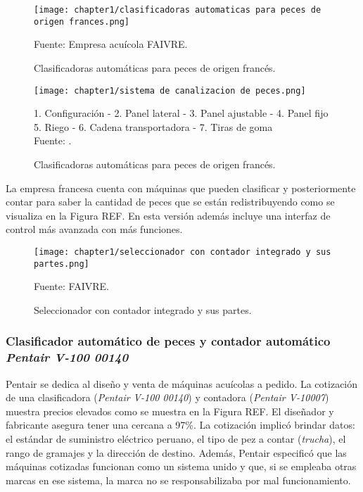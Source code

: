 \begin{figure}[H]
	\centering
	\texttt{[image: chapter1/clasificadoras automaticas para peces de origen frances.png]}
	\caption{Clasificadoras automáticas para peces de origen francés.}
	Fuente: Empresa acuícola FAIVRE.
	\label{fig:clasificadoras automaticas para peces de origen frances}
\end{figure}

\begin{figure}[H]
	\centering
	\texttt{[image: chapter1/sistema de canalizacion de peces.png]}
	\caption{Clasificadoras automáticas para peces de origen francés.}
	1. Configuración - 2. Panel lateral - 3. Panel ajustable - 4. Panel fijo \\
	5. Riego - 6. Cadena transportadora - 7. Tiras de goma\\
	Fuente: \cite{FAIVRE2018}.
	\label{fig:sistema de canalizacion de peces}
\end{figure}

La empresa francesa cuenta con máquinas que pueden clasificar y posteriormente contar para saber la cantidad de peces que se están redistribuyendo como se visualiza en la Figura REF. En esta versión además incluye una interfaz de control más avanzada con más funciones.

\begin{figure}[H]
	\centering
	\texttt{[image: chapter1/seleccionador con contador integrado y sus partes.png]}
	\caption{Seleccionador con contador integrado y sus partes.}
	Fuente: FAIVRE.
	\label{fig:seleccionador con contador integrado y sus partes}
\end{figure}

\subsubsection{Clasificador automático de peces y contador automático \textit{Pentair V-100 00140}}

Pentair se dedica al diseño y venta de máquinas acuícolas a pedido. La cotización de una clasificadora (\textit{Pentair V-100 00140}) y contadora (\textit{Pentair V-10007}) muestra precios elevados como se muestra en la Figura REF. El diseñador y fabricante asegura tener una cercana a 97\%. La cotización implicó brindar datos: el estándar de suministro eléctrico peruano, el tipo de pez a contar (\textit{trucha}), el rango de gramajes y la dirección de destino. Además, Pentair especificó que las máquinas cotizadas funcionan como un sistema unido y que, si se empleaba otras marcas en ese sistema, la marca no se responsabilizaba por mal funcionamiento.

